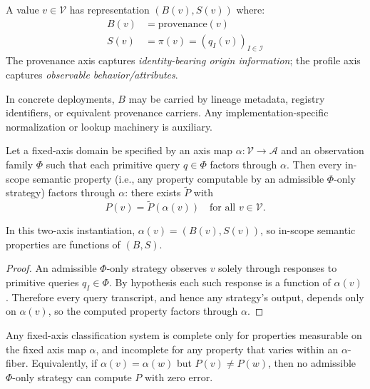 \begin{definition}
A value $v \in \mathcal{V}$ has representation $(B(v), S(v))$ where:
\begin{align}
B(v) &= \text{provenance}(v) \\
S(v) &= \pi(v) = (q_I(v))_{I \in \mathcal{I}}
\end{align}
The provenance axis captures \emph{identity-bearing origin information}; the profile axis captures \emph{observable behavior/attributes}.

In concrete deployments, $B$ may be carried by lineage metadata, registry identifiers, or equivalent provenance carriers. Any implementation-specific normalization or lookup machinery is auxiliary.
\end{definition}

\begin{theorem}\label{thm:model-completeness}
Let a fixed-axis domain be specified by an axis map $\alpha: \mathcal{V} \to \mathcal{A}$ and an observation family $\Phi$ such that each primitive query $q \in \Phi$ factors through $\alpha$. Then every in-scope semantic property (i.e., any property computable by an admissible $\Phi$-only strategy) factors through $\alpha$: there exists $\tilde{P}$ with
\[
P(v) = \tilde{P}(\alpha(v)) \quad \text{for all } v \in \mathcal{V}.
\]
\end{theorem}

In this two-axis instantiation, $\alpha(v) = (B(v), S(v))$, so in-scope semantic properties are functions of $(B,S)$.

\begin{proof}
An admissible $\Phi$-only strategy observes $v$ solely through responses to primitive queries $q_I \in \Phi$. By hypothesis each such response is a function of $\alpha(v)$. Therefore every query transcript, and hence any strategy's output, depends only on $\alpha(v)$, so the computed property factors through $\alpha$.
\end{proof}

\begin{corollary}\label{cor:fixed-axis-incompleteness}
Any fixed-axis classification system is complete only for properties measurable on the fixed axis map $\alpha$, and incomplete for any property that varies within an $\alpha$-fiber. Equivalently, if $\alpha(v)=\alpha(w)$ but $P(v)\neq P(w)$, then no admissible $\Phi$-only strategy can compute $P$ with zero error.
\end{corollary}

